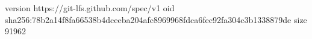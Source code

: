 version https://git-lfs.github.com/spec/v1
oid sha256:78b2a14f8fa66538b4dceeba204afc8969968fdca6fec92fa304c3b1338879de
size 91962
